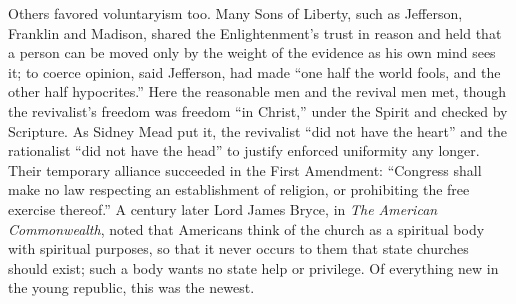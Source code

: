 Others favored voluntaryism too. Many Sons of Liberty, such as Jefferson, Franklin and Madison,
shared the Enlightenment's trust in reason and held that a person can be moved only by the weight of
the evidence as his own mind sees it; to coerce opinion, said Jefferson, had made ``one half the world fools,
and the other half hypocrites.'' Here the reasonable men and the revival men met, though the
revivalist's freedom was freedom ``in Christ,'' under the Spirit and checked by Scripture. As Sidney
Mead put it, the revivalist ``did not have the heart'' and the rationalist ``did not have the head''
to justify enforced uniformity any longer. Their temporary alliance succeeded in the First
Amendment: ``Congress shall make no law respecting an establishment of religion, or prohibiting the
free exercise thereof.'' A century later Lord James Bryce, in \emph{The American Commonwealth}, noted
that Americans think of the church as a spiritual body with spiritual purposes, so that it never
occurs to them that state churches should exist; such a body wants no state help or privilege.
Of everything new in the young republic, this was the newest.

\begin{keyfacts}
\end{keyfacts}
